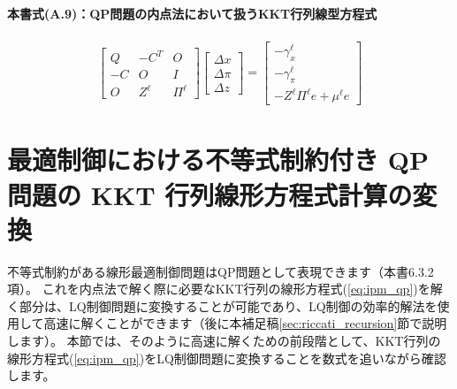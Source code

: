 \documentclass[a4paper]{jarticle}
\begin{document}
\paragraph{本書\cite{fukatsu2024python}式(A.9)：QP問題の内点法において扱うKKT行列線型方程式}

\begin{align}
\begin{bmatrix}
Q & - C^T & O 
\\
- C & O & I 
\\
O & Z^\ell & \Pi^\ell
\end{bmatrix}
\begin{bmatrix}
\Delta x
\\
\Delta \pi
\\
\Delta z
\end{bmatrix}
=
\begin{bmatrix}
-\gamma_x^\ell
\\
-\gamma_\pi^\ell
\\
-Z^\ell\Pi^\ell e +\mu^\ell e
\end{bmatrix}
\label{eq:ipm_qp}
\end{align}

\section{最適制御における不等式制約付き QP 問題の KKT 行列線形方程式計算の変換}

不等式制約がある線形最適制御問題はQP問題として表現できます（本書\cite{fukatsu2024python}6.3.2項）。
これを内点法で解く際に必要なKKT行列の線形方程式(\ref{eq:ipm_qp})を解く部分は、LQ制御問題に変換することが可能\cite{rao1998application}であり、LQ制御の効率的解法を使用して高速に解くことができます（後に本補足稿\ref{sec:riccati_recursion}節で説明します）。
本節では、そのように高速に解くための前段階として、KKT行列の線形方程式(\ref{eq:ipm_qp})をLQ制御問題に変換することを数式を追いながら確認します。
\end{document}
